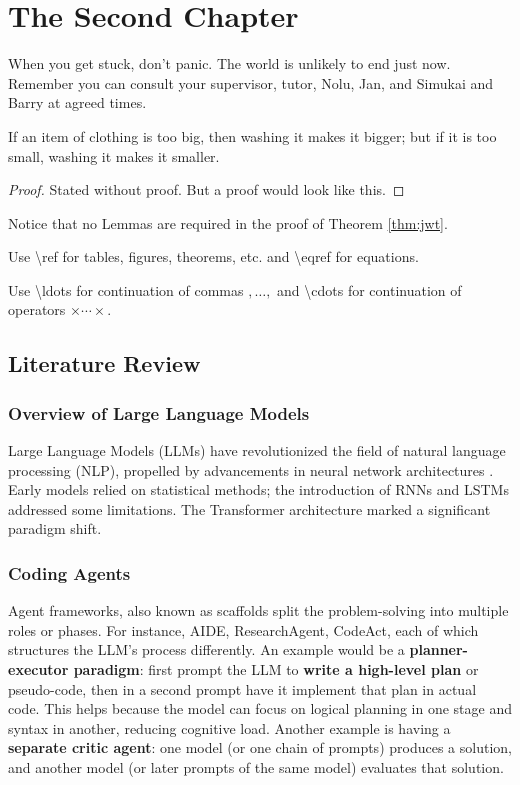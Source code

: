 \chapter{The Second Chapter}

When you get stuck, don't panic. 
The world is unlikely to end just now. 
Remember you can consult your supervisor, tutor, Nolu, Jan, 
and Simukai and Barry at agreed times. 

\begin{thm}
\label{thm:jwt}
If an item of clothing is too big, then washing it makes it bigger;
but if it is too small, washing it makes it smaller.
\end{thm}
\begin{proof}
Stated without proof. But a proof would look like this. 
\end{proof}

Notice that no Lemmas are required in the proof of Theorem \ref{thm:jwt}.

Use \textbackslash ref for tables, figures, theorems, etc. and \textbackslash eqref for equations.

Use \textbackslash ldots for continuation of commas $,\ldots,$ and \textbackslash cdots for continuation of operators $\times\cdots\times$.


\section{Literature Review}


\subsection{Overview of Large Language Models}
Large Language Models (LLMs) have revolutionized the field of natural language processing (NLP), propelled by advancements in neural network architectures \cite{vaswani2017attention}. Early models relied on statistical methods; the introduction of RNNs and LSTMs \cite{hochreiter1997long} addressed some limitations. The Transformer architecture \cite{vaswani2017attention} marked a significant paradigm shift.

\subsection{Coding Agents}
Agent frameworks, also known as scaffolds split the problem-solving into multiple roles or phases. For instance, AIDE, ResearchAgent, CodeAct, each of which structures the LLM’s process differently. An example would be a \textbf{planner-executor paradigm}: first prompt the LLM to \textbf{write a high-level plan} or pseudo-code, then in a second prompt have it implement that plan in actual code. This helps because the model can focus on logical planning in one stage and syntax in another, reducing cognitive load. Another example is having a \textbf{separate critic agent}: one model (or one chain of prompts) produces a solution, and another model (or later prompts of the same model) evaluates that solution. 

